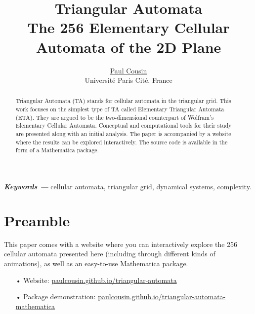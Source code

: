 \documentclass{article}
\providecommand{\keywords}[1]
{
  \small	
  \textbf{\textit{Keywords ---}} #1
}
\begin{document}
\title{\Huge Triangular Automata \\
\Large The 256 Elementary Cellular Automata of the 2D Plane}

\author{\href{https://orcid.org/0000-0002-3866-7615}{Paul Cousin} \\
        \small Université Paris Cité, France
}

\date{}

\maketitle

\begin{abstract}
Triangular Automata (TA) stands for cellular automata in the triangular grid. This work focuses on the simplest type of TA called Elementary Triangular Automata (ETA). They are argued to be the two-dimensional counterpart of Wolfram's Elementary Cellular Automata. Conceptual and computational tools for their study are presented along with an initial analysis. The paper is accompanied by a website where the results can be explored interactively. The source code is available in the form of a Mathematica package. \smallskip
\end{abstract} 

\keywords{cellular automata, triangular grid, dynamical systems, complexity.}

\vspace{20pt}

\section{Preamble} \label{preamble}
This paper comes with a website where you can interactively explore the 256 cellular automata presented here (including through different kinds of animations), as well as an easy-to-use Mathematica package.

\begin{enumerate}
    \item[•]\hspace{-1.5mm} Website: \href{https://paulcousin.github.io/triangular-automata}{paulcousin.github.io/triangular-automata}
    \item[•]\hspace{-1.5mm} Package demonstration: \href{https://paulcousin.github.io/triangular-automata-mathematica}{paulcousin.github.io/triangular-automata-mathematica}
\end{enumerate}
\end{document}
